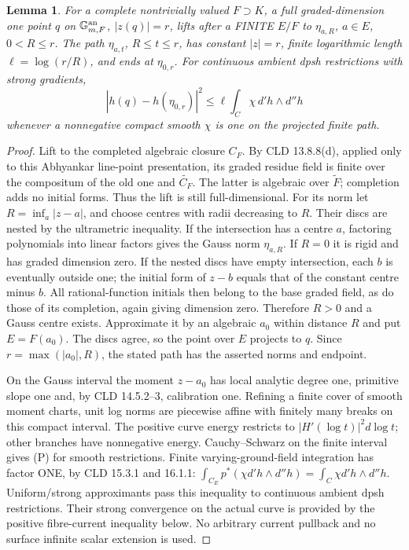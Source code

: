 \documentclass[11pt]{article}
\newtheorem{lemma}[theorem]{Lemma}
\theoremstyle{remark}\newtheorem{remark}[theorem]{Remark}
\begin{document}
\begin{lemma}\label{disc}
For a complete nontrivially valued $F\supset K$, a full graded-dimension
one point $q$ on $\mathbb G_{m,F}^{\rm an}$, $|z(q)|=r$, lifts after
a FINITE $E/F$ to $\eta_{a,R}$, $a\in E$, $0<R\le r$.
The path $\eta_{a,t}$, $R\le t\le r$, has constant $|z|=r$,
finite logarithmic length $\ell=\log(r/R)$, and ends at $\eta_{0,r}$.
For continuous ambient dpsh restrictions with strong gradients,
\[
|h(q)-h(\eta_{0,r})|^2\le
\ell\int_C\chi\,d'h\wedge d''h
\tag{P}
\]
whenever a nonnegative compact smooth $\chi$ is one on the projected
finite path.
\end{lemma}
\begin{proof}
Lift to the completed algebraic closure $C_F$. By CLD 13.8.8(d),
applied only to this Abhyankar line-point presentation, its graded
residue field is finite over the compositum of the old one and
$\widetilde {C_F}$. The latter is algebraic over $\widetilde F$;
completion adds no initial forms. Thus the lift is still full-dimensional.
For its norm let $R=\inf_a|z-a|$, and choose centres with radii
decreasing to $R$. Their discs are nested by the ultrametric inequality.
If the intersection has a centre $a$, factoring polynomials into linear
factors gives the Gauss norm $\eta_{a,R}$. If $R=0$ it is rigid and
has graded dimension zero. If the nested discs have empty intersection,
each $b$ is eventually outside one; the initial form of $z-b$ equals
that of the constant centre minus $b$. All rational-function initials
then belong to the base graded field, as do those of its completion,
again giving dimension zero. Therefore $R>0$ and a Gauss centre exists.
Approximate it by an algebraic $a_0$ within distance $R$ and put
$E=F(a_0)$. The discs agree, so the point over $E$ projects to $q$.
Since $r=\max(|a_0|,R)$, the stated path has the asserted norms and
endpoint.

On the Gauss interval the moment $z-a_0$ has local analytic degree one,
primitive slope one and, by CLD 14.5.2--3, calibration one.
Refining a finite cover of smooth moment charts, unit log norms are
piecewise affine with finitely many breaks on this compact interval.
The positive curve energy restricts to $|H'(\log t)|^2d\log t$;
other branches have nonnegative energy. Cauchy--Schwarz on the finite
interval gives (P) for smooth restrictions. Finite varying-ground-field
integration has factor ONE, by CLD 15.3.1 and 16.1.1:
$\int_{C_E}p^*(\chi d'h\wedge d''h)=\int_C\chi d'h\wedge d''h$.
Uniform/strong approximants pass this inequality to continuous ambient
dpsh restrictions. Their strong convergence on the actual curve is
provided by the positive fibre-current inequality below. No arbitrary
current pullback and no surface infinite scalar extension is used.
\end{proof}
\end{document}

